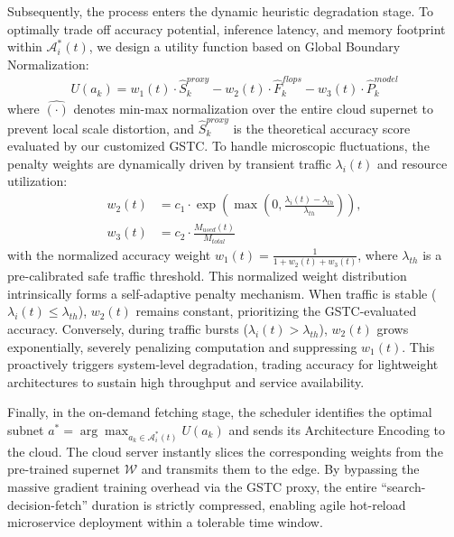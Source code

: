 \documentclass[conference]{IEEEtran}
\begin{document}
Subsequently, the process enters the dynamic heuristic degradation stage. To optimally trade off accuracy potential, inference latency, and memory footprint within $\mathcal{A}_i^*(t)$, we design a utility function based on Global Boundary Normalization:
\begin{equation}
\begin{aligned}
U(a_k) = w_1(t) \cdot \widehat{S}_k^{proxy} - w_2(t) \cdot \widehat{F}_k^{flops} - w_3(t) \cdot \widehat{P}_k^{model}
\label{eq:utility_function}
\end{aligned}
\end{equation}
where $\widehat{(\cdot)}$ denotes min-max normalization over the entire cloud supernet to prevent local scale distortion, and $\widehat{S}_k^{proxy}$ is the theoretical accuracy score evaluated by our customized GSTC. To handle microscopic fluctuations, the penalty weights are dynamically driven by transient traffic $\lambda_i(t)$ and resource utilization:
\begin{equation}
\begin{aligned}
    w_2(t) &= c_1 \cdot \exp\left( \max\left(0, \frac{\lambda_i(t) - \lambda_{th}}{\lambda_{th}}\right) \right), \\
    w_3(t) &= c_2 \cdot \frac{M_{used}(t)}{M_{total}}
\end{aligned}
\label{eq:dynamic_weights}
\end{equation}
with the normalized accuracy weight $w_1(t) = \frac{1}{1 + w_2(t) + w_3(t)}$, where $\lambda_{th}$ is a pre-calibrated safe traffic threshold. This normalized weight distribution intrinsically forms a self-adaptive penalty mechanism. When traffic is stable ($\lambda_i(t) \le \lambda_{th}$), $w_2(t)$ remains constant, prioritizing the GSTC-evaluated accuracy. Conversely, during traffic bursts ($\lambda_i(t) > \lambda_{th}$), $w_2(t)$ grows exponentially, severely penalizing computation and suppressing $w_1(t)$. This proactively triggers system-level degradation, trading accuracy for lightweight architectures to sustain high throughput and service availability.

Finally, in the on-demand fetching stage, the scheduler identifies the optimal subnet $a^* = \arg\max_{a_k \in \mathcal{A}_i^*(t)} U(a_k)$ and sends its Architecture Encoding to the cloud. The cloud server instantly slices the corresponding weights from the pre-trained supernet $\mathcal{W}$ and transmits them to the edge. By bypassing the massive gradient training overhead via the GSTC proxy, the entire ``search-decision-fetch'' duration is strictly compressed, enabling agile hot-reload microservice deployment within a tolerable time window.
\end{document}
